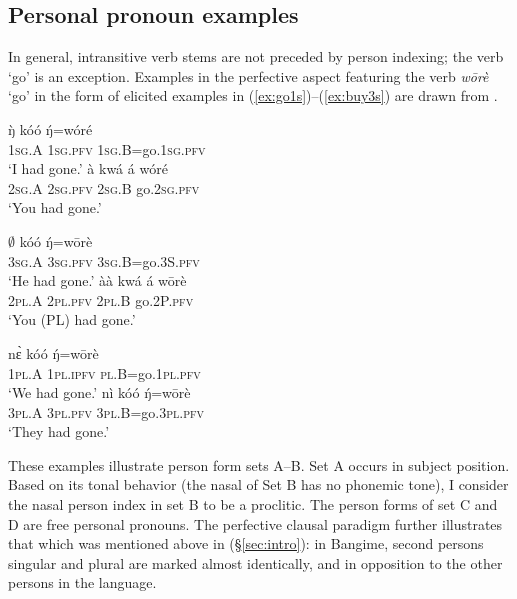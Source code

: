 \documentclass[output=paper]{langscibook}
\begin{document}
\subsection{Personal pronoun examples}
\label{subsec:pe}
In general, intransitive verb stems are not preceded by person indexing; the verb `go' is an exception. Examples in the perfective aspect featuring the verb \textit{wōrè} `go' in the form of elicited examples in (\ref{ex:go1s})--(\ref{ex:buy3s}) are drawn from \citet[~273]{HantganHeath2018}.
\begin{multicols}{2}
	\ea \label{ex:go1s}
	\gll 
	ŋ̀ kóó ŋ́=wóré \\
	1\textsc{sg}.A 1\textsc{sg}.\textsc{pfv} 1\textsc{sg}.B=go.1\textsc{sg}.\textsc{pfv} \\
	\glt `I had gone.'
	\z
	\ea \label{ex:go2s}
	\gll à kwá á wóré \\
	2\textsc{sg}.A 2\textsc{sg}.\textsc{pfv} 2\textsc{sg}.B go.2\textsc{sg}.\textsc{pfv} \\
	\glt `You had gone.'
	\z
\end{multicols}
\begin{multicols}{2}
	\ea \label{ex:buy3s}
	\gll $\emptyset$ kóó ŋ́=wōrè \\
	3\textsc{sg}.A 3\textsc{sg}.\textsc{pfv} 3\textsc{sg}.B=go.3S.\textsc{pfv}  \\
	\glt `He had gone.'
	\z
	\ea \label{ex:buy2p}
	\gll àà kwá á wōrè \\
	2\textsc{pl}.A 2\textsc{pl}.\textsc{pfv} 2\textsc{pl}.B go.2P.\textsc{pfv} \\
	\glt `You (PL) had gone.'
	\z	 
\end{multicols}
\begin{multicols}{2}
	\ea \label{ex:buy1p}
	\gll nɛ̀ kóó ŋ́=wōrè \\
	1\textsc{pl}.A 1\textsc{pl}.\textsc{ipfv} \textsc{pl}.B=go.1\textsc{pl}.\textsc{pfv}  \\
	\glt `We had gone.'
	\z
	\ea \label{ex:buy3p}
	\gll nì kóó ŋ́=wōrè \\
	3\textsc{pl}.A 3\textsc{pl}.\textsc{pfv} 3\textsc{pl}.B=go.3\textsc{pl}.\textsc{pfv} \\
	\glt `They had gone.'
	\z	 
\end{multicols}
These examples illustrate person form sets A--B. Set A occurs in subject position. Based on its tonal behavior (the nasal of Set B has no phonemic tone), I consider the nasal person index in set B to be a proclitic. The person forms of set C and D are free personal pronouns. The perfective clausal paradigm further illustrates that which was mentioned above in (\S \ref{sec:intro}): in Bangime, second persons singular and plural are marked almost identically, and in opposition to the other persons in the language.
\end{document}
